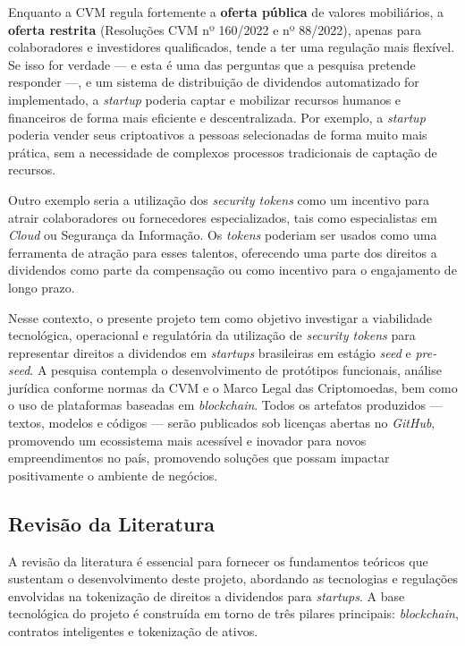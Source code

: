 \documentclass[12pt, a4paper, oneside, openright, chapter=TITLE]{abntex2}
\begin{document}
Enquanto a CVM regula fortemente a \textbf{oferta pública} de valores mobiliários, a \textbf{oferta restrita} (Resoluções CVM nº 160/2022 e nº 88/2022), apenas para colaboradores e investidores qualificados, tende a ter uma regulação mais flexível. Se isso for verdade — e esta é uma das perguntas que a pesquisa pretende responder —, e um sistema de distribuição de dividendos automatizado for implementado, a \textit{startup} poderia captar e mobilizar recursos humanos e financeiros de forma mais eficiente e descentralizada. Por exemplo, a \textit{startup} poderia vender seus criptoativos a pessoas selecionadas de forma muito mais prática, sem a necessidade de complexos processos tradicionais de captação de recursos.

Outro exemplo seria a utilização dos \textit{security tokens} como um incentivo para atrair colaboradores ou fornecedores especializados, tais como especialistas em \textit{Cloud} ou Segurança da Informação. Os \textit{tokens} poderiam ser usados como uma ferramenta de atração para esses talentos, oferecendo uma parte dos direitos a dividendos como parte da compensação ou como incentivo para o engajamento de longo prazo.

Nesse contexto, o presente projeto tem como objetivo investigar a viabilidade tecnológica, operacional e regulatória da utilização de \textit{security tokens} para representar direitos a dividendos em \textit{startups} brasileiras em estágio \textit{seed} e \textit{pre-seed}. A pesquisa contempla o desenvolvimento de protótipos funcionais, análise jurídica conforme normas da CVM e o Marco Legal das Criptomoedas, bem como o uso de plataformas baseadas em \textit{blockchain}. Todos os artefatos produzidos — textos, modelos e códigos — serão publicados sob licenças abertas no \textit{GitHub}, promovendo um ecossistema mais acessível e inovador para novos empreendimentos no país, promovendo soluções que possam impactar positivamente o ambiente de negócios.

\subsection{Revisão da Literatura}

\hspace*{\parindent} A revisão da literatura é essencial para fornecer os fundamentos teóricos que sustentam o desenvolvimento deste projeto, abordando as tecnologias e regulações envolvidas na tokenização de direitos a dividendos para \textit{startups}. A base tecnológica do projeto é construída em torno de três pilares principais: \textit{blockchain}, contratos inteligentes e tokenização de ativos.
\end{document}
